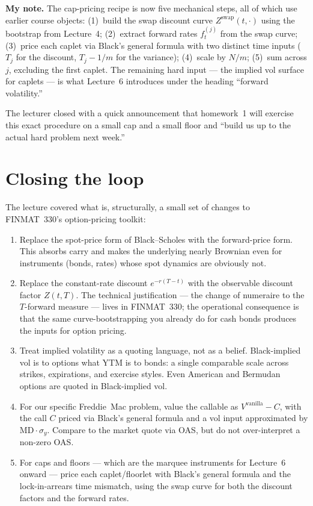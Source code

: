 \begin{checkpoint}
\textbf{My note.} The cap-pricing recipe is now five mechanical
steps, all of which use earlier course objects: (1)~build the swap
discount curve $Z^{\text{swap}}(t, \cdot)$ using the bootstrap from
Lecture~4; (2)~extract forward rates $f^{(j)}_t$ from the swap curve;
(3)~price each caplet via Black's general formula with two distinct
time inputs ($T_j$ for the discount, $T_j - 1/m$ for the variance);
(4)~scale by $N/m$; (5)~sum across $j$, excluding the first caplet.
The remaining hard input --- the implied vol surface for caplets ---
is what Lecture~6 introduces under the heading ``forward
volatility.''
\end{checkpoint}

The lecturer closed with a quick announcement that homework~1 will
exercise this exact procedure on a small cap and a small floor and
``build us up to the actual hard problem next week.''

\section{Closing the loop}\label{L5-sec:close}

The lecture covered what is, structurally, a small set of changes to
FINMAT~330's option-pricing toolkit:

\begin{enumerate}[label=(\arabic*)]
  \item Replace the spot-price form of Black--Scholes with the
        forward-price form. This absorbs carry and makes the
        underlying nearly Brownian even for instruments (bonds,
        rates) whose spot dynamics are obviously not.
  \item Replace the constant-rate discount $e^{-r(T-t)}$ with the
        observable discount factor $Z(t,T)$. The technical justification
        --- the change of numeraire to the $T$-forward measure ---
        lives in FINMAT~330; the operational consequence is that the
        same curve-bootstrapping you already do for cash bonds
        produces the inputs for option pricing.
  \item Treat implied volatility as a quoting language, not as a
        belief. Black-implied vol is to options what YTM is to
        bonds: a single comparable scale across strikes, expirations,
        and exercise styles. Even American and Bermudan options are
        quoted in Black-implied vol.
  \item For our specific Freddie~Mac problem, value the callable as
        $V^{\text{vanilla}} - C$, with the call $C$ priced via Black's
        general formula and a vol input approximated by
        $\mathrm{MD}\cdot\sigma_y$. Compare to the market quote via
        OAS, but do not over-interpret a non-zero OAS.
  \item For caps and floors --- which are the marquee instruments for
        Lecture~6 onward --- price each caplet/floorlet with Black's
        general formula and the lock-in-arrears time mismatch, using
        the swap curve for both the discount factors and the forward
        rates.
\end{enumerate}

